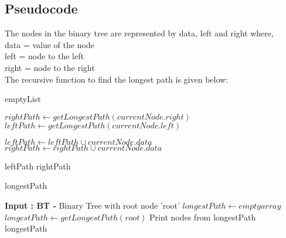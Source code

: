 \documentclass[12pt]{article}
\begin{document}
\subsection{Pseudocode}
The nodes in the binary tree are represented by data, left and right where,\\
data = value of the node\\
left = node to the left\\
right = node to the right\\
The recursive function to find the longest path is given below:
\begin{algorithm}[H]
    \begin{algorithmic}
    
    
        \State \Return emptyList
    \EndIf
    
    \State $rightPath \gets getLongestPath(currentNode.right)$
    \State $leftPath \gets getLongestPath(currentNode.left)$
    
        \State $leftPath \gets leftPath \cup currentNode.data$
    \Else
        \State $rightPath \gets rightPath \cup currentNode.data$
    \EndIf
    
        \State \Return leftPath
    \Else
        \State \Return rightPath
    \EndIf
    \EndFunction
    \end{algorithmic}
    \end{algorithm}
    
\begin{algorithm}[H]
    \caption{longestPath}\label{alg:mst}
    \begin{algorithmic}
        \State \textbf{Input : BT -} Binary Tree with root node 'root'
        \State $longestPath \gets empty array$ 
        \State $longestPath \gets getLongestPath(root)$
        \State Print nodes from longestPath
        \State \Return longestPath
    \end{algorithmic}
\end{algorithm}
\end{document}
